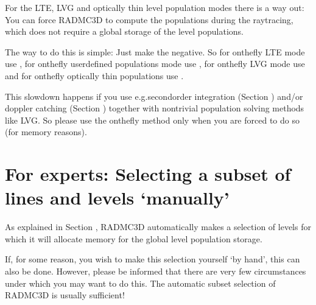 \documentclass[letterpaper,10pt,english]{sphinxmanual}
\begin{document}
For the LTE, LVG and optically thin level population modes there is a way out:
You can force RADMC\sphinxhyphen{}3D to compute the populations  during the
ray\sphinxhyphen{}tracing, which does not require a global storage of the level populations.

The way to do this is simple: Just make the  negative. So for
on\sphinxhyphen{}the\sphinxhyphen{}fly LTE mode use , for on\sphinxhyphen{}the\sphinxhyphen{}fly user\sphinxhyphen{}defined
populations mode use , for on\sphinxhyphen{}the\sphinxhyphen{}fly LVG mode use
 and for on\sphinxhyphen{}the\sphinxhyphen{}fly optically thin populations use
.

 This slow\sphinxhyphen{}down happens if you use e.g.second\sphinxhyphen{}order integration (Section {\hyperref[\detokenize{imagesspectra:sec-second-order}]{}}) and/or doppler
catching (Section {\hyperref[\detokenize{lineradtrans:sec-doppler-catching}]{}}) together with non\sphinxhyphen{}trivial
population solving methods like LVG. So please use the on\sphinxhyphen{}the\sphinxhyphen{}fly method only
when you are forced to do so (for memory reasons).


\section{For experts: Selecting a subset of lines and levels ‘manually’}
\label{\detokenize{lineradtrans:for-experts-selecting-a-subset-of-lines-and-levels-manually}}\label{\detokenize{lineradtrans:sec-line-selection}}
As explained in Section {\hyperref[\detokenize{lineradtrans:sec-calcstore-levpop}]{}}, RADMC\sphinxhyphen{}3D automatically
makes a selection of levels for which it will allocate memory for the global
level population storage.

If, for some reason, you wish to make this selection yourself ‘by hand’, this
can also be done. However, please be informed that there are very few
circumstances under which you may want to do this. The automatic subset
selection of RADMC\sphinxhyphen{}3D is usually sufficient!
\end{document}
